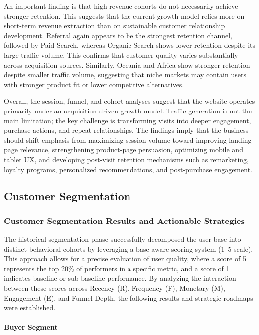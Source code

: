 \documentclass[conference]{IEEEtran}
\begin{document}
An important finding is that high-revenue cohorts do not necessarily achieve stronger retention. This suggests that the current growth model relies more on short-term revenue extraction than on sustainable customer relationship development. Referral again appears to be the strongest retention channel, followed by Paid Search, whereas Organic Search shows lower retention despite its large traffic volume. This confirms that customer quality varies substantially across acquisition sources. Similarly, Oceania and Africa show stronger retention despite smaller traffic volume, suggesting that niche markets may contain users with stronger product fit or lower competitive alternatives.

Overall, the session, funnel, and cohort analyses suggest that the website operates primarily under an acquisition-driven growth model. Traffic generation is not the main limitation; the key challenge is transforming visits into deeper engagement, purchase actions, and repeat relationships. The findings imply that the business should shift emphasis from maximizing session volume toward improving landing-page relevance, strengthening product-page persuasion, optimizing mobile and tablet UX, and developing post-visit retention mechanisms such as remarketing, loyalty programs, personalized recommendations, and post-purchase engagement.


\subsection{Customer Segmentation}
\subsubsection{Customer Segmentation Results and Actionable Strategies}

The historical segmentation phase successfully decomposed the user base into distinct behavioral cohorts by leveraging a base-aware scoring system (1--5 scale). This approach allows for a precise evaluation of user quality, where a score of 5 represents the top 20\% of performers in a specific metric, and a score of 1 indicates baseline or sub-baseline performance. By analyzing the interaction between these scores across Recency (R), Frequency (F), Monetary (M), Engagement (E), and Funnel Depth, the following results and strategic roadmaps were established.


\paragraph{Buyer Segment}
\end{document}
